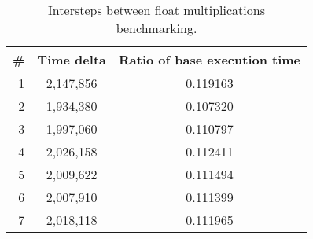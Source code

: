 \begin{table}
\centering
\begin{tabular}{rcc}
\# & Time delta & Ratio of base execution time\\
\hline
1 & 2,147,856 & 0.119163 \\
2 & 1,934,380 & 0.107320 \\
3 & 1,997,060 & 0.110797 \\
4 & 2,026,158 & 0.112411 \\
5 & 2,009,622 & 0.111494 \\
6 & 2,007,910 & 0.111399 \\
7 & 2,018,118 & 0.111965 \\
\end{tabular}
\captionsetup{justification=centering}
\caption{Intersteps between float multiplications benchmarking.}
\end{table}

